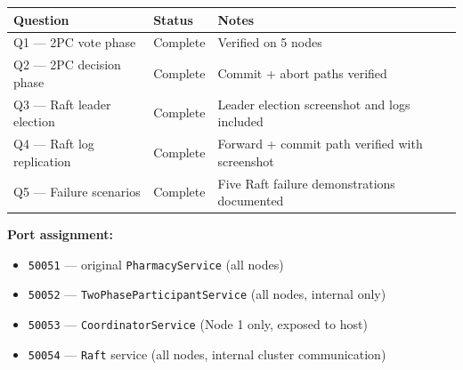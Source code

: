 \begin{center}
\begin{tabular}{lll}
  \toprule
  Question & Status & Notes \\
  \midrule
  Q1 — 2PC vote phase & Complete & Verified on 5 nodes \\
  Q2 — 2PC decision phase & Complete & Commit + abort paths verified \\
  Q3 — Raft leader election & Complete & Leader election screenshot and logs included \\
  Q4 — Raft log replication & Complete & Forward + commit path verified with screenshot \\
  Q5 — Failure scenarios & Complete & Five Raft failure demonstrations documented \\
  \bottomrule
\end{tabular}
\end{center}

\textbf{Port assignment:}
\begin{itemize}
  \item \texttt{50051} — original \texttt{PharmacyService} (all nodes)
  \item \texttt{50052} — \texttt{TwoPhaseParticipantService} (all nodes, internal only)
  \item \texttt{50053} — \texttt{CoordinatorService} (Node 1 only, exposed to host)
  \item \texttt{50054} — \texttt{Raft} service (all nodes, internal cluster communication)
\end{itemize}
